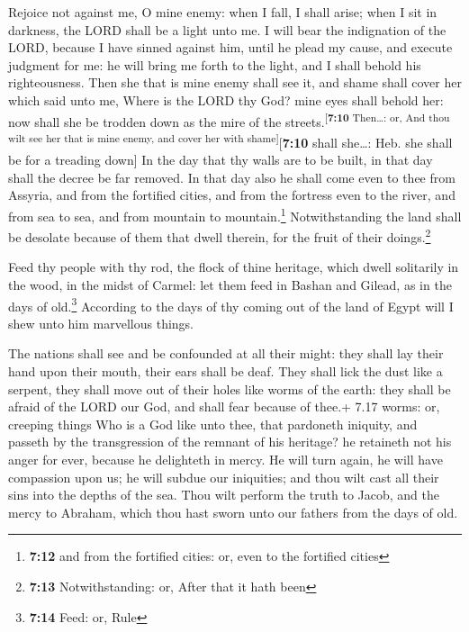  Rejoice not against me, O mine enemy: when I fall, I
shall arise; when I sit in darkness, the LORD shall be a light unto me.
 I will bear the indignation of the LORD, because I have
sinned against him, until he plead my cause, and execute judgment for
me: he will bring me forth to the light, and I shall behold his
righteousness.  Then she that is mine enemy shall see it,
and shame shall cover her which said unto me, Where is the LORD thy God?
mine eyes shall behold her: now shall she be trodden down as the mire of
the streets.\textsuperscript{{[}\textbf{7:10} Then\ldots: or, And thou
wilt see her that is mine enemy, and cover her with
shame{]}}{[}\textbf{7:10} shall she\ldots: Heb. she shall be for a
treading down{]}  In the day that thy walls are to be
built, in that day shall the decree be far removed.  In
that day also he shall come even to thee from Assyria, and from the
fortified cities, and from the fortress even to the river, and from sea
to sea, and from mountain to mountain.\footnote{\textbf{7:12} and from
  the fortified cities: or, even to the fortified cities}
 Notwithstanding the land shall be desolate because of
them that dwell therein, for the fruit of their doings.\footnote{\textbf{7:13}
  Notwithstanding: or, After that it hath been}

 Feed thy people with thy rod, the flock of thine
heritage, which dwell solitarily in the wood, in the midst of Carmel:
let them feed in Bashan and Gilead, as in the days of old.\footnote{\textbf{7:14}
  Feed: or, Rule}  According to the days of thy coming
out of the land of Egypt will I shew unto him marvellous things.

 The nations shall see and be confounded at all their
might: they shall lay their hand upon their mouth, their ears shall be
deaf.  They shall lick the dust like a serpent, they
shall move out of their holes like worms of the earth: they shall be
afraid of the LORD our God, and shall fear because of thee.+ 7.17 worms:
or, creeping things  Who is a God like unto thee, that
pardoneth iniquity, and passeth by the transgression of the remnant of
his heritage? he retaineth not his anger for ever, because he delighteth
in mercy.  He will turn again, he will have compassion
upon us; he will subdue our iniquities; and thou wilt cast all their
sins into the depths of the sea.  Thou wilt perform the
truth to Jacob, and the mercy to Abraham, which thou hast sworn unto our
fathers from the days of old.
